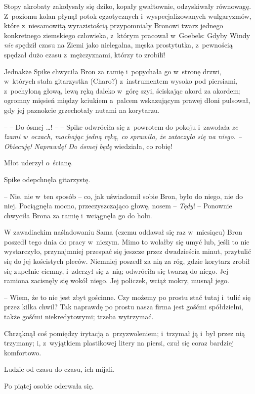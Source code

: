 \documentclass[oneside,polish,11pt,rmheadings]{mwbk}
\begin{document}
Stopy akrobaty zakołysały się dziko, kopały gwałtownie, odzyskiwały równowagę. Z~poziomu kolan płynął potok egzotycznych i~wyspecjalizowanych wulgaryzmów, które z~niesamowitą wyrazistością przypomniały Bronowi twarz jednego konkretnego ziemskiego człowieka, z~którym pracował w~Goebels: Gdyby Windy \textit{nie }spędził czasu na Ziemi jako nielegalna, męska prostytutka, z~pewnością spędzał dużo czasu z~mężczyznami, którzy to zrobili! 

Jednakże Spike chwyciła Bron za ramię i~popychała go w~stronę drzwi, w~których stała gitarzystka (Charo?) z~instrumentem wysoko pod piersiami, z~pochyloną głową, lewą ręką daleko w~górę szyi, ściskając akord za akordem; ogromny mięsień między kciukiem a~palcem wskazującym prawej dłoni pulsował, gdy jej paznokcie grzechotały nutami na korytarzu.  

-- -- Do ósmej \ldots ! -- -- Spike odwróciła się z~powrotem do pokoju i~zawołała \textit{ze łzami w~oczach, machając jedną ręką, co sprawiło, że zatoczyła się na niego. -- Obiecuję! Naprawdę!  Do ósmej będę } wiedziała, co robię!

Młot uderzył o~ścianę.  

Spike odepchnęła gitarzystę. 

-- Nie, nie w~ten sposób -- co, jak uświadomił sobie Bron, było do niego, nie do niej.  Pociągnęła mocno, przeczyszczająco głowę, nosem -- \textit{Tędy}! -- Ponownie chwyciła Brona za ramię i~wciągnęła go do holu. 

W zawadiackim naśladowaniu Sama (czemu oddawał się raz w~miesiącu) Bron poszedł tego dnia do pracy w~niczym. Mimo to wolałby się umyć lub, jeśli to nie wystarczyło, przynajmniej przespać się jeszcze przez dwadzieścia minut, przytulić się do jej kościstych pleców. Niemniej poszedł za nią za róg, gdzie korytarz zrobił się zupełnie ciemny, i~zderzył się z~nią; odwróciła się twarzą do niego. Jej ramiona zacisnęły się wokół niego. Jej policzek, wciąż mokry, musnął jego.  

-- Wiem, że to nie jest zbyt gościnne. Czy możemy po prostu stać tutaj i~tulić się przez kilka chwil? Tak naprawdę po prostu nasza firma jest gośćmi spółdzielni, także gośćmi niekredytowymi; trzeba wytrzymać. 

Chrząknął coś pomiędzy irytacją a~przyzwoleniem; i~trzymał ją i~był przez nią trzymany; i, z~wyjątkiem plastikowej litery na piersi, czuł się coraz bardziej komfortowo. 

Ludzie od czasu do czasu, ich mijali. 

Po piątej osobie oderwała się. 
\end{document}
